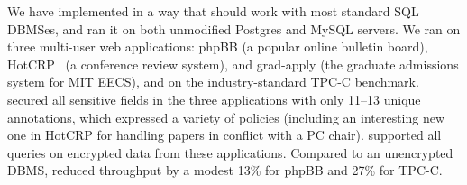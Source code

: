  
 

We have implemented \name{} in a way that should work with most
standard SQL DBMSes, and ran it on both unmodified Postgres and MySQL
servers. We ran \name{} on three multi-user web applications: phpBB (a
popular online bulletin board), HotCRP~\cite{kohler:hotcrp}
(a conference review system),
and grad-apply (the graduate admissions system for MIT EECS), and on the
industry-standard TPC-C benchmark. \name{} secured all sensitive
fields in the three applications with only 11--13 unique
annotations, which expressed a variety of policies (including an
interesting new one in HotCRP for handling papers in conflict with a
PC chair).  \name{} supported all queries on encrypted data from these
applications.  Compared to an unencrypted DBMS, \name{} reduced
throughput by a modest 13\% for phpBB and 27\% for TPC-C\@.

 




